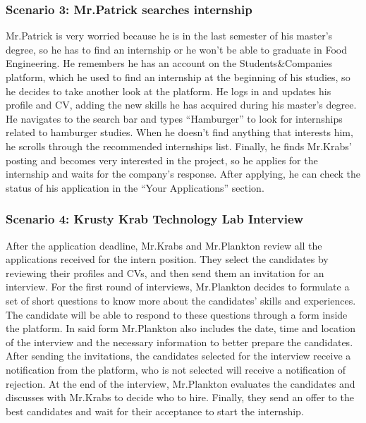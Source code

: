 \subsubsection{Scenario 3: Mr.Patrick searches internship}\label{subsubsec:scenario_3}
Mr.Patrick is very worried because he is in the last semester of his master's degree, so he has to find an internship or he won't be able to graduate in Food Engineering.
He remembers he has an account on the Students\&Companies platform, which he used to find an internship at the beginning of his studies, so he decides 
to take another look at the platform. He logs in and updates his profile and CV, adding the new skills he has acquired during his master’s degree.
He navigates to the search bar and types ``Hamburger'' to look for internships related to hamburger studies. When he doesn’t find anything that 
interests him, he scrolls through the recommended internships list. Finally, he finds Mr.Krabs' posting and becomes very interested in the 
project, so he applies for the internship and waits for the company's response. After applying, he can check the status of his application in 
the ``Your Applications'' section.

\subsubsection{Scenario 4: Krusty Krab Technology Lab Interview}\label{subsubsec:scenario_4}
After the application deadline, Mr.Krabs and Mr.Plankton review all the applications received for the intern position. They select the
candidates by reviewing their profiles and CVs, and then send them an invitation for an interview. For the first round of interviews, Mr.Plankton
decides to formulate a set of short questions to know more about the candidates' skills and experiences. The candidate will be able to respond to 
these questions through a form inside the platform. In said form Mr.Plankton also includes the date, time and location of the interview and the 
necessary information to better prepare the candidates. After sending the invitations, the candidates selected for the interview receive a notification 
from the platform, who is not selected will receive a notification of rejection. At the end of the interview, Mr.Plankton evaluates the candidates 
and discusses with Mr.Krabs to decide who to hire. Finally, they send an offer to the best candidates and wait for their acceptance to start the internship.


